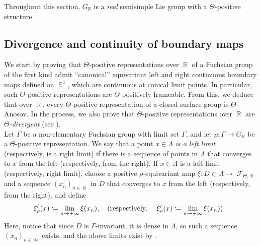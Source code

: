 \documentclass{amsart}
\theoremstyle{plain}
\theoremstyle{definition}
\DeclareMathOperator{\Fc}{\mathcal{F}}
\DeclareMathOperator{\Nb}{{\mathbb{N}}}
\DeclareMathOperator{\Rb}{{\mathbb{R}}}
\DeclareMathOperator{\Sb}{\mathbb{S}}
\newcommand*\from{\colon}
\newcommand{\1}{\mathbf{1}}
\begin{document}
Throughout this section, $G_{\Rb}$ is a \emph{real} semisimple Lie group with a $\Theta$-positive structure.

\subsection{Divergence and continuity of boundary maps}
\label{subsection: continuity boundary maps}

We start by proving that $\Theta$-positive representations over $\Rb$ of a Fuchsian group of the first kind admit ``canonical'' equivariant left and right continuous boundary maps defined on $\Sb^1$, which are continuous at conical limit points. In particular, such $\Theta$-positive representations are $\Theta$-positively frameable. From this, we deduce that over $\Rb$, every $\Theta$-positive representation of a closed surface group is $\Theta$-Anosov. In the process, we also prove that $\Theta$-positive representations over $\Rb$ are \emph{$\Theta$-divergent} (see ).\\ 

Let $\Gamma$ be a non-elementary Fuchsian group with limit set $\Gamma$, and let $\rho\from\Gamma\to G_{\Rb}$ be a $\Theta$-positive representation. We say that a point $x\in\Lambda$ \emph{is a left limit} (respectively, is a right limit) if there is a sequence of points in $\Lambda$ that converges to $x$ from the left (respectively, from the right). If $x\in\Lambda$ is a left limit (respectively, right limit), choose a positive $\rho$-equivariant map $\xi:D\subset\Lambda\to\Fc_{\Theta,\Rb}$ and a sequence $(x_n)_{n\in\Nb}$ in $D$ that converges to $x$ from the left (respectively, from the right), and define 
\[\xi_\rho^l(x) \coloneqq \lim_{n\to +\infty} \xi(x_n), \quad \textnormal{(respectively, } \quad \xi_\rho^r(x) \coloneqq \lim_{n\to +\infty} \xi(x_n))~.\]
Here, notice that since $D$ is $\Gamma$-invariant, it is dense in $\Lambda$, so such a sequence $(x_n)_{n\in\Nb}$ exists, and the above limits exist by .
\end{document}
